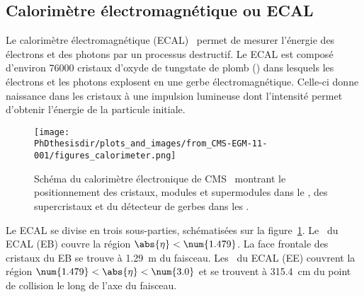 \subsection{Calorimètre électromagnétique ou ECAL}\label{chapter-LHC-section-CMS-subsec-ECAL}
Le calorimètre électromagnétique (ECAL)~\cite{cms_paper,CERN-LHCC-97-033,CMS-EGM-11-001,CMS-DP-2019-005,CMS-DP-2020-021} permet de mesurer l'énergie des électrons et des photons par un processus destructif.
Le ECAL est composé d'environ \num{76000} cristaux d'oxyde de tungstate de plomb () dans lesquels les électrons et les photons explosent en une gerbe électromagnétique.
Celle-ci donne naissance dans les cristaux à une impulsion lumineuse dont l'intensité permet d'obtenir l'énergie de la particule initiale.
\begin{figure}[b]
\centering
\texttt{[image: \\PhDthesisdir/plots\_and\_images/from\_CMS-EGM-11-001/figures\_calorimeter.png]}
\caption[Schéma du calorimètre électronique de CMS.]{Schéma du calorimètre électronique de CMS~\cite{cms_paper,CMS-EGM-11-001} montrant le positionnement des cristaux, modules et supermodules dans le \CMSbarrel, des supercristaux et du détecteur de gerbes dans les \CMSendcaps.}
\label{fig-chapter-LHC-section-CMS-subsec-ECAL-CMS-EGM-11-001-figures_calorimeter}
\end{figure}
\par Le ECAL se divise en trois sous-parties, schématisées sur la figure~\ref{fig-chapter-LHC-section-CMS-subsec-ECAL-CMS-EGM-11-001-figures_calorimeter}.
Le \CMSbarrel\ du ECAL (EB) couvre la région $\abs{\eta}<\num{1.479}$.
La face frontale des cristaux du EB se trouve à \SI{1.29}{\meter} du faisceau.
Les \CMSendcaps\ du ECAL (EE) couvrent la région $\num{1.479}<\abs{\eta}<\num{3.0}$ et se trouvent à \SI{315.4}{\centi\meter} du point de collision le long de l'axe du faisceau.

